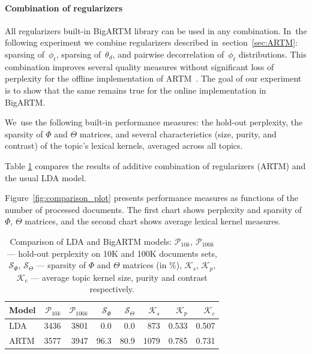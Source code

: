 \documentclass{sig-alternate-2013}
\begin{document}
\paragraph{Combination of regularizers}

All regularizers built-in \mbox{BigARTM} library can be used in any combination.
In~the following experiment we combine regularizers described in~section~\ref{sec:ARTM}:
sparsing of~$\phi_{t}$, sparsing of~$\theta_{d}$, and pairwise decorrelation of~$\phi_{t}$ distributions.
This combination improves several quality measures without significant loss of perplexity
for the offline implementation of ARTM~\cite{voron14aist}.
The goal of our experiment is to show that the same remains true
for the online implementation in \mbox{BigARTM}.

We~use the following built-in performance measures:
the hold-out perplexity,
the sparsity of $\Phi$ and $\Theta$ matrices, and
several characteristics (size, purity, and contrast)
of the topic's lexical kernels, averaged across all topics.

Table \ref{tab:model_comparison} compares the results of additive combination of regularizers (ARTM) and the usual LDA model.

Figure~\ref{fig:comparison_plot} presents performance measures as functions of the number of processed documents.
The first chart shows perplexity and sparsity of $\Phi$, $\Theta$ matrices, and
the second chart shows average lexical kernel measures.

\begin{table}[t]
    \caption{Comparison of LDA and BigARTM models:
        $\mathcal{P}_{10k}$, $\mathcal{P}_{100k}$ --- hold-out perplexity on 10K and 100K documents sets,
        $\mathcal{S}_{\Phi}$, $\mathcal{S}_{\Theta}$ --- sparsity of $\Phi$ and $\Theta$ matrices (in \%),
        $\mathcal{K}_{s}$, $\mathcal{K}_{p}$, $\mathcal{K}_{c}$ --- average topic kernel size, purity and contrast respectively.}
    \label{tab:model_comparison}
    \centering\tabcolsep=4.6pt
    \begin{tabular}[t]{l|rrrrrrr}
    \hline
    Model & $\mathcal{P}_{10k}$ & $\mathcal{P}_{100k}$ &  $\mathcal{S}_{\Phi}$ & $\mathcal{S}_{\Theta}$ &  $\mathcal{K}_{s}$ & $\mathcal{K}_{p}$ &  $\mathcal{K}_{c}$ \\
    \hline
        LDA    & 3436 & 3801 & 0.0  & 0.0  & 873  & 0.533 & 0.507 \\
        ARTM   & 3577 & 3947 & 96.3 & 80.9 & 1079 & 0.785 & 0.731 \\
    \hline
    \end{tabular}
\end{table}
\end{document}
